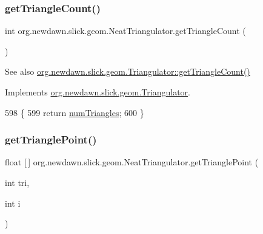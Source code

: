 \subsubsection{\texorpdfstring{get\+Triangle\+Count()}{getTriangleCount()}}
{\footnotesize\ttfamily int org.\+newdawn.\+slick.\+geom.\+Neat\+Triangulator.\+get\+Triangle\+Count (\begin{DoxyParamCaption}{ }\end{DoxyParamCaption})\hspace{0.3cm}{\ttfamily [inline]}}

\begin{DoxySeeAlso}{See also}
\mbox{\hyperlink{interfaceorg_1_1newdawn_1_1slick_1_1geom_1_1_triangulator_a7a5d68a694f2b80878c48563b5ea6f1f}{org.\+newdawn.\+slick.\+geom.\+Triangulator\+::get\+Triangle\+Count()}} 
\end{DoxySeeAlso}


Implements \mbox{\hyperlink{interfaceorg_1_1newdawn_1_1slick_1_1geom_1_1_triangulator_a7a5d68a694f2b80878c48563b5ea6f1f}{org.\+newdawn.\+slick.\+geom.\+Triangulator}}.


\begin{DoxyCode}
598                                   \{
599         \textcolor{keywordflow}{return} \mbox{\hyperlink{classorg_1_1newdawn_1_1slick_1_1geom_1_1_neat_triangulator_a5a9d015e9872ed5961cddfb49b3d1853}{numTriangles}};
600     \}
\end{DoxyCode}
\mbox{\label{classorg_1_1newdawn_1_1slick_1_1geom_1_1_neat_triangulator_a286bb2dbff64783e498ec5b41003fb03}} 
\subsubsection{\texorpdfstring{get\+Triangle\+Point()}{getTrianglePoint()}}
{\footnotesize\ttfamily float \mbox{[}$\,$\mbox{]} org.\+newdawn.\+slick.\+geom.\+Neat\+Triangulator.\+get\+Triangle\+Point (\begin{DoxyParamCaption}\item[{int}]{tri,  }\item[{int}]{i }\end{DoxyParamCaption})\hspace{0.3cm}{\ttfamily [inline]}}

